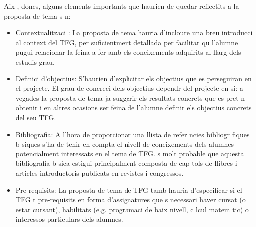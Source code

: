 Aix , doncs, alguns elements importants que haurien de quedar reflectits a la proposta de tema s n:
\begin{itemize}
\item Contextualitzaci : La proposta de tema hauria d'incloure una breu introducci  al context del \ac{TFG}, per  suficientment detallada per facilitar qu  l'alumne pugui relacionar la feina a fer amb els coneixements adquirits al llarg dels estudis grau.
\item Definici  d'objectius: S'haurien d'explicitar els objectius que es perseguiran en el projecte. El grau de concreci  dels objectius dependr  del projecte en si: a vegades la proposta de tema ja suggerir  els resultats concrets que es pret n obtenir i en altres ocasions ser  feina de l'alumne definir els objectius concrets del seu \ac{TFG}.
\item Bibliografia: A l'hora de proporcionar una llista de refer ncies bibliogr fiques b siques s'ha de tenir en compta el nivell de coneixements dels alumnes potencialment interessats
    en el tema de \ac{TFG}.  s molt probable que aquesta bibliografia b sica estigui principalment composta de cap tols de llibres i articles introductoris publicats en revistes i congressos.
\item Pre-requisits: La proposta de tema de \ac{TFG} tamb  hauria d'especificar si el \ac{TFG} t  pre-requisits en forma d'assignatures que  s necessari haver cursat (o estar cursant), habilitats (e.g. programaci  de baix nivell, c lcul matem tic) o interessos particulars dels alumnes.
\end{itemize}

